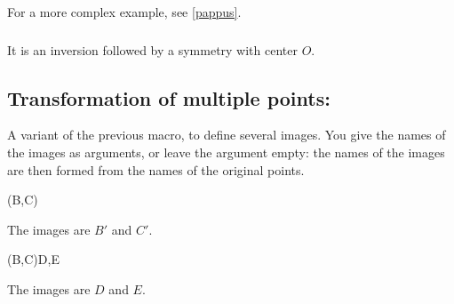 For a more complex example, see  \ref{pappus}.

\subsubsection{}
It is an inversion followed by a symmetry with center $O$.
\begin{tkzexample}[latex=5cm,small]  
\end{tkzexample} 


\newpage
\subsection{Transformation of multiple points:  }
A variant of the previous macro, to define several images.
You give the names of the images as arguments, or leave the argument empty: the names of the images are then formed from the names of the original points.

\begin{tkzltxexample}[]
\tkzDefPointsBy[translation= from A to A'](B,C){}
\end{tkzltxexample}
The images are $B'$ and $C'$.

\begin{tkzltxexample}[]
\tkzDefPointsBy[translation= from A to A'](B,C){D,E} 
\end{tkzltxexample}
The images are $D$ and $E$.

